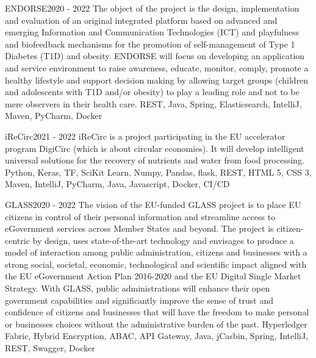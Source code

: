 \begin{projects}
	\project
	{ENDORSE}{2020 - 2022}
	{}
	{The object of the project is the design, implementation and evaluation of an original integrated platform based on advanced and emerging Information and Communication Technologies (ICT) and playfulness and biofeedback mechanisms for the promotion of self-management of Type 1 Diabetes (T1D) and obesity. ENDORSE will focus on developing an application and service environment to raise awareness, educate, monitor, comply, promote a healthy lifestyle and support decision making by allowing target groups (children and adolescents with T1D and/or obesity) to play a leading role and not to be mere observers in their health care.}
	{REST, Java, Spring, Elasticsearch, IntelliJ, Maven, PyCharm, Docker}

	\project
	{iReCirc}{2021  - 2022}
	{}
	{iReCirc is a project participating in the EU accelerator program DigiCirc (which is about circular economies). It will develop intelligent universal solutions for the recovery of nutrients and water from food processing.}
	{Python, Keras, TF, SciKit Learn, Numpy, Pandas, flask, REST, HTML 5, CSS 3, Maven, IntelliJ, PyCharm, Java, Javascript, Docker, CI/CD}

	\project
	{GLASS}{2020 - 2022}
	{}
	{The vision of the EU-funded GLASS project is to place EU citizens in control of their personal information and streamline access to eGovernment services across Member States and beyond. The project is citizen-centric by design, uses state-of-the-art technology and envisages to produce a model of interaction among public administration, citizens and businesses with a strong social, societal, economic, technological and scientific impact aligned with the EU eGovernment Action Plan 2016-2020 and the EU Digital Single Market Strategy. With GLASS, public administrations will enhance their open government capabilities and significantly improve the sense of trust and confidence of citizens and businesses that will have the freedom to make personal or businesses choices without the administrative burden of the past.}
	{Hyperledger Fabric, Hybrid Encryption, ABAC, API Gateway, Java, jCasbin, Spring, IntelliJ, REST, Swagger, Docker}


\end{projects}
